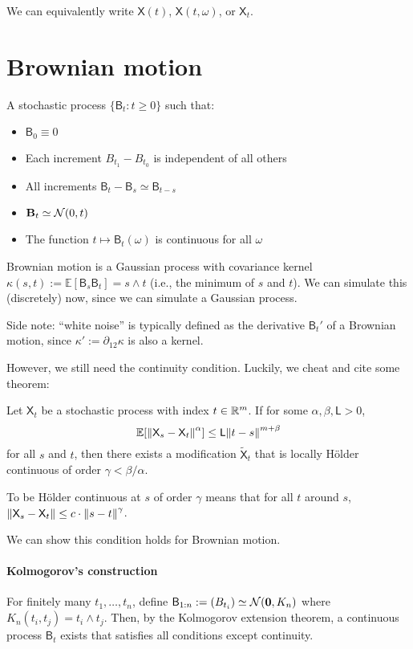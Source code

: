 \documentclass[notes]{agony}
\newcommand{\rv}{\mathsf}
\newcommand{\E}{\mathbb{E}}
\renewcommand{\N}{\mathcal{N}}
\begin{document}
We can equivalently write $\rv X(t)$, $\rv X(t,\omega)$, or $\rv X_t$.

\section{Brownian motion}

\begin{defn}
	A stochastic process $\{\rv B_t : t \geq 0\}$ such that:
	\begin{itemize}[nosep]
		\item $\rv B_0 \equiv 0$
		\item Each increment $B_{t_1} - B_{t_0}$ is independent of all others
		\item All increments $\rv B_t - \rv B_s \simeq \rv B_{t-s}$
		\item $\vb B_t \simeq \N(0,t)$
		\item The function $t \mapsto \rv B_t(\omega)$ is continuous for all $\omega$
	\end{itemize}
\end{defn}

Brownian motion is a Gaussian process with covariance kernel
$\kappa(s,t) := \E[\rv B_s\rv B_t] = s \wedge t$
(i.e., the minimum of $s$ and $t$).
We can simulate this (discretely) now, since we can simulate a Gaussian process.

Side note: ``white noise'' is typically defined as the derivative $\rv B_t'$
of a Brownian motion, since $\kappa' := \partial_{12}\kappa$ is also a kernel.

However, we still need the continuity condition.
Luckily, we cheat and cite some theorem:

\begin{theorem}
	Let $\rv X_t$ be a stochastic process with index $t \in \mathbb{R}^m$.
	If for some $\alpha,\beta,\rv L > 0$,
	\[ \E[\norm{\rv X_s - \rv X_t}^\alpha] \leq \rv L\norm{t-s}^{m+\beta} \]
	for all $s$ and $t$,
	then there exists a modification $\tilde{\rv{X}}_t$
	that is locally Hölder continuous of order $\gamma < \beta/\alpha$.
\end{theorem}
To be Hölder continuous at $s$ of order $\gamma$
means that for all $t$ around $s$, $\norm{\rv X_s - \rv X_t} \leq c\cdot\norm{s-t}^\gamma$.

We can show this condition holds for Brownian motion.

\paragraph{Kolmogorov's construction}
For finitely many $t_1,\dotsc,t_n$,
define $\rv B_{1:n} := (B_{t_i}) \simeq \mathcal N(\vb 0, K_n)$
where $K_n(t_i,t_j) = t_i \wedge t_j$.
Then, by the Kolmogorov extension theorem,
a continuous process $\rv B_t$ exists that satisfies all conditions
except continuity.
\end{document}
